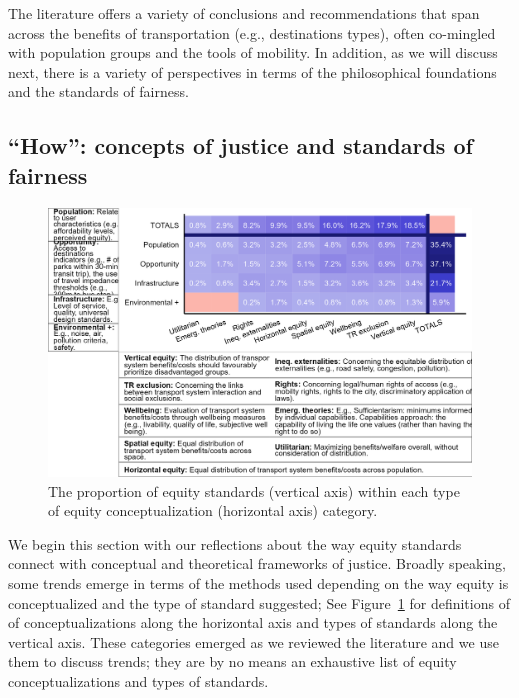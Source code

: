 \documentclass[12pt, oneside]{report}
\begin{document}
The literature offers a variety of conclusions and recommendations that
span across the benefits of transportation (e.g., destinations types),
often co-mingled with population groups and the tools of mobility. In
addition, as we will discuss next, there is a variety of perspectives in
terms of the philosophical foundations and the standards of fairness.

\hypertarget{how-concepts-of-justice-and-standards-of-fairness}{%
\subsection{``How'': concepts of justice and standards of
fairness}\label{how-concepts-of-justice-and-standards-of-fairness}}

\begin{figure}

{\centering \includegraphics[width=5.5in,height=\textheight]{figures/standards_conc_percentages_plot_and_table.png}

}

\caption{\label{fig-fig6}The proportion of equity standards (vertical
axis) within each type of equity conceptualization (horizontal axis)
category.}

\end{figure}

We begin this section with our reflections about the way equity
standards connect with conceptual and theoretical frameworks of justice.
Broadly speaking, some trends emerge in terms of the methods used
depending on the way equity is conceptualized and the type of standard
suggested; See Figure~\ref{fig-fig6} for definitions of of
conceptualizations along the horizontal axis and types of standards
along the vertical axis. These categories emerged as we reviewed the
literature and we use them to discuss trends; they are by no means an
exhaustive list of equity conceptualizations and types of standards.
\end{document}
